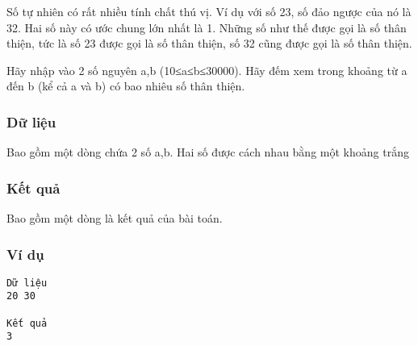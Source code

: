 



   Số tự nhiên có rất nhiều tính chất thú vị. Ví dụ với số 23, số đảo ngược của nó là 32. Hai số này có ước chung lớn nhất là 1. Những số như thế được gọi là số thân thiện, tức là số 23 được gọi là số thân thiện, số 32 cũng được gọi là số thân thiện.  

   Hãy nhập vào 2 số nguyên a,b (10≤a≤b≤30000). Hãy đếm xem trong khoảng từ a đến b (kể  cả a và b) có bao nhiêu số thân thiện.  

\subsubsection{   Dữ liệu  }

   Bao gồm một dòng chứa 2 số a,b. Hai số được cách nhau bằng một khoảng trắng  

\subsubsection{   Kết quả  }

   Bao gồm một dòng là kết quả của bài toán.  

\subsubsection{   Ví dụ  }
\begin{verbatim}
Dữ liệu
20 30		

Kết quả
3
\end{verbatim}